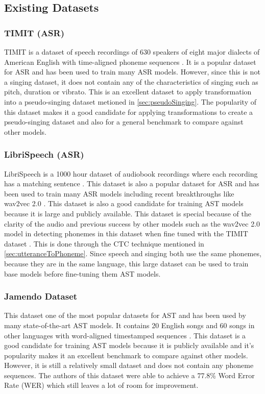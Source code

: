\documentclass[letterpaper, 12pt]{article}
\begin{document}
\begin{multicols*}{2}
\subsection{Existing Datasets}

\subsubsection{TIMIT (ASR)}
TIMIT is a dataset of speech recordings of 630 speakers of eight major dialects of American English
with time-aligned phoneme sequences \citep{TIMIT}. It is a popular dataset for ASR and has been used
to train many ASR models. However, since this is not a singing dataset, it does not contain any of
the characteristics of singing such as pitch, duration or vibrato. This is an excellent dataset to
apply transformation into a pseudo-singing dataset metioned in \ref{sec:pseudoSinging}. The popularity of this dataset
makes it a good candidate for applying transformations to create a pseudo-singing dataset and also
for a general benchmark to compare against other models.

\subsubsection{LibriSpeech (ASR)}
LibriSpeech is a 1000 hour dataset of audiobook recordings where each recording has a matching sentence \citep{Librispeech}. This
dataset is also a popular dataset for ASR and has been used to train many ASR models including
recent breakthroughs like wav2vec 2.0 \citep{wav2vec}. This dataset is also a good candidate for
training AST models because it is large and publicly available. This dataset is special because of
the clarity of the audio and previous success by other models such as the wav2vec 2.0 model in
detecting phonemes in this dataset when fine tuned with the TIMIT dataset \citep{wav2vec}. This is
done through the CTC technique mentioned in \ref{sec:utteranceToPhoneme}. Since
speech and singing both use the same phonemes, because they are in the same language, this large
dataset can be used to train base models before fine-tuning them AST models.

\subsubsection{Jamendo Dataset}
This dataset one of the most popular datasets for AST and has been used by many state-of-the-art
AST models. It contains 20 English songs and 60 songs in other languages with word-aligned timestamped sequences \citep{JamendoLyrics}. This dataset
is a good candidate for training AST models because it is publicly available and it's popularity
makes it an excellent benchmark to compare against other models. However, it is still a relatively
small dataset and does not contain any phoneme sequences. The authors of this dataset were able to
achieve a 77.8\% Word Error Rate (WER) which still leaves a lot of room for improvement.


\end{multicols*}
\end{document}
